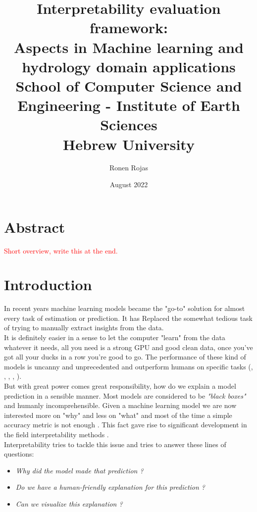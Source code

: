 \documentclass[12pt]{report}
\title{
	{Interpretability evaluation framework: \\ Aspects in Machine learning and hydrology domain applications}\\
	{\large School of Computer Science and Engineering - 
		Institute of Earth Sciences}\\
	{\large Hebrew University}
}
\author{Ronen Rojas}
\date{August 2022}
\begin{document}
\maketitle
\tableofcontents
\newpage

\chapter{Abstract} 

\textcolor{red}{Short overview, write this at the end.}



\newpage
\chapter{Introduction} 

In recent years machine learning models became the "go-to" solution for almost every task of estimation or prediction. It has Replaced the somewhat tedious task of trying to manually extract insights from the data.\\

It is definitely easier in a sense to let the computer "learn" from the data whatever it needs, all you need is a strong GPU and good clean data, once you've got all your ducks in a row you're good to go. The performance of these kind of models is uncanny and unprecedented and outperform humans on specific tasks (\cite{he2015deep}, \cite{DBLP:journals/corr/abs-1805-01890}, \cite{DBLP:journals/corr/abs-1905-01392}, \cite{DBLP:journals/corr/MnihKSGAWR13}, \cite{Silver_2016}).\\

But with great power comes great responsibility, how do we explain a model prediction in a sensible manner. Most models are considered to be \textit{"black boxes"} and humanly incomprehensible. Given a machine learning model we are now interested more on "why" and less on "what" and most of the time a simple accuracy metric is not enough . This fact gave rise to significant development in the field interpretability methods 
\cite{molnar2019}. \\

Interpretability tries to tackle this issue and tries to answer these lines of questions:
\begin{itemize}
	\item \textit{Why did the model made that prediction ?}	
	\item \textit{Do we have a human-friendly explanation for this prediction ?}	
	\item \textit{Can we visualize this explanation ? }	
\end{itemize}
\end{document}
